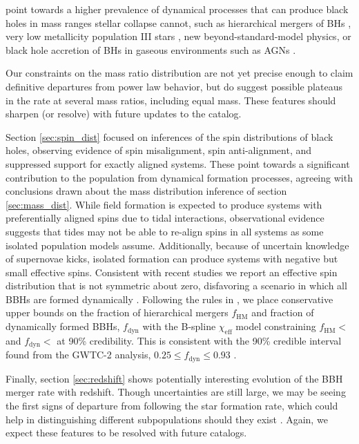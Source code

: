 point towards a higher prevalence of dynamical processes that can produce black holes in mass ranges stellar collapse cannot, such as hierarchical mergers of BHs \citep{Fishbach_2017,Doctor_2020,Kimball_genealogy,kimball2020evidence,doctor2021black,Fishbach_2022}, 
very low metallicity population III stars \citep{Belczynski_2020,Farrell_2020}, new beyond-standard-model physics\citep{Croon_newphysics,Sakstein_2020}, or black hole accretion of BHs in gaseous environments such as AGNs \citep{Secunda_2020,McKernan_2020,cruzosorio2021gw190521}. 

Our constraints on the mass ratio distribution are not yet precise enough to claim definitive departures from power law behavior, but do suggest possible plateaus in the rate at several mass ratios, including equal mass.  These features should sharpen (or resolve) with future updates to the catalog.

Section \ref{sec:spin_dist} focused on inferences of the spin distributions of black holes, observing evidence of spin misalignment, spin anti-alignment, and suppressed support 
for exactly aligned systems. These point towards a significant contribution to the population from dynamical formation processes, agreeing with 
conclusions drawn about the mass distribution inference of section \ref{sec:mass_dist}. While field formation is expected to produce systems with preferentially 
aligned spins due to tidal interactions, observational evidence suggests that tides may not be able to re-align spins in all systems as some 
isolated population models assume. Additionally, because of uncertain knowledge of supernovae kicks, isolated formation can produce systems with negative but small effective spins. 
Consistent with recent studies we report an effective spin distribution that is not symmetric about zero, disfavoring a scenario in which all BBHs are formed dynamically \citep{o3a_pop,o3b_astro_dist,Callister_NoEvidence}. 
Following the rules in \citet{Fishbach_2022}, 
we place conservative upper bounds on the fraction of hierarchical mergers $f_\mathrm{HM}$ and fraction of dynamically formed BBHs, $f_\mathrm{dyn}$ with 
the B-spline $\chi_\mathrm{eff}$ model constraining $f_\mathrm{HM} < $\result{$\macros[ChiEffective][iid][frac_hm][10th percentile]$} 
and $f_\mathrm{dyn} < $ at 90\% credibility. This is consistent with the 90\% credible interval found from the GWTC-2 analysis, $0.25\leq f_\mathrm{dyn} \leq 0.93$ \citep{o3a_pop}. 

Finally, section \ref{sec:redshift} shows potentially interesting evolution of the BBH merger rate with redshift.  Though uncertainties are still large, we may be seeing the first signs of departure from following the star formation rate, which could help in distinguishing different subpopulations should they exist \citep{van_Son_2022}.  Again, we expect these features to be resolved with future catalogs.

